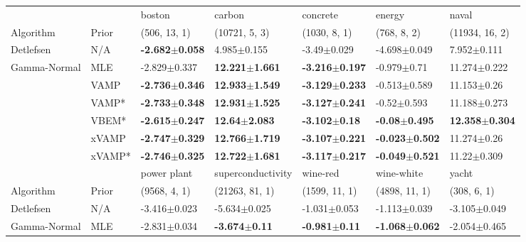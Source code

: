 \begin{tabular}{lllllll}
\toprule
             &        &                     boston &                     carbon &                   concrete &                     energy &                      naval \\
Algorithm & Prior& (506, 13, 1)& (10721, 5, 3)& (1030, 8, 1)& (768, 8, 2)& (11934, 16, 2)\\
\midrule
Detlefsen & N/A &  \textbf{-2.682$\pm$0.058} &            4.985$\pm$0.155 &            -3.49$\pm$0.029 &           -4.698$\pm$0.049 &            7.952$\pm$0.111 \\
Gamma-Normal & MLE &           -2.829$\pm$0.337 &  \textbf{12.221$\pm$1.661} &  \textbf{-3.216$\pm$0.197} &            -0.979$\pm$0.71 &           11.274$\pm$0.222 \\
             & VAMP &  \textbf{-2.736$\pm$0.346} &  \textbf{12.933$\pm$1.549} &  \textbf{-3.129$\pm$0.233} &           -0.513$\pm$0.589 &            11.153$\pm$0.26 \\
             & VAMP* &  \textbf{-2.733$\pm$0.348} &  \textbf{12.931$\pm$1.525} &  \textbf{-3.127$\pm$0.241} &            -0.52$\pm$0.593 &           11.188$\pm$0.273 \\
             & VBEM* &  \textbf{-2.615$\pm$0.247} &   \textbf{12.64$\pm$2.083} &   \textbf{-3.102$\pm$0.18} &   \textbf{-0.08$\pm$0.495} &  \textbf{12.358$\pm$0.304} \\
             & xVAMP &  \textbf{-2.747$\pm$0.329} &  \textbf{12.766$\pm$1.719} &  \textbf{-3.107$\pm$0.221} &  \textbf{-0.023$\pm$0.502} &            11.274$\pm$0.26 \\
             & xVAMP* &  \textbf{-2.746$\pm$0.325} &  \textbf{12.722$\pm$1.681} &  \textbf{-3.117$\pm$0.217} &  \textbf{-0.049$\pm$0.521} &            11.22$\pm$0.309 \\
\midrule
             &        &                power plant &          superconductivity &                   wine-red &                 wine-white &                      yacht \\
Algorithm & Prior& (9568, 4, 1)& (21263, 81, 1)& (1599, 11, 1)& (4898, 11, 1)& (308, 6, 1)\\
\midrule
Detlefsen & N/A &           -3.416$\pm$0.023 &           -5.634$\pm$0.025 &           -1.031$\pm$0.053 &           -1.113$\pm$0.039 &           -3.105$\pm$0.049 \\
Gamma-Normal & MLE &           -2.831$\pm$0.034 &   \textbf{-3.674$\pm$0.11} &   \textbf{-0.981$\pm$0.11} &  \textbf{-1.068$\pm$0.062} &           -2.054$\pm$0.465 \\

\end{tabular}
